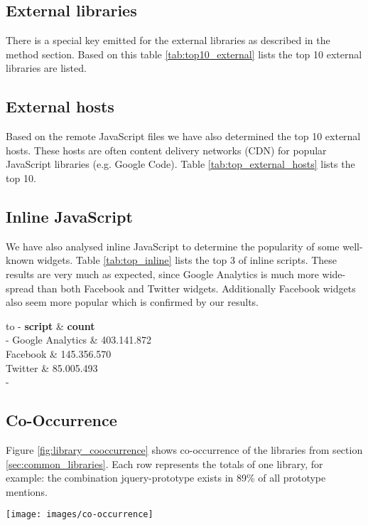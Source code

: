 

\subsection{External libraries}
There is a special key emitted for the external libraries as described in the method section. Based on this table \ref{tab:top10_external} lists the top 10 external libraries are listed.

\subsection{External hosts}
Based on the remote JavaScript files we have also determined the top 10 external hosts. These hosts are often content delivery networks (CDN) for popular JavaScript libraries (e.g. Google Code). Table \ref{tab:top_external_hosts} lists the top 10.



\subsection{Inline JavaScript}
We have also analysed inline JavaScript to determine the popularity of some well-known widgets. Table \ref{tab:top_inline} lists the top 3 of inline scripts. These results are very much as expected, since Google Analytics is much more wide-spread than both Facebook and Twitter widgets. Additionally Facebook widgets also seem more popular which is confirmed by our results.

\begin{table}
	\begin{tabu} to 
		\tabucline-
		\rowfont{\normalfont\bfseries}
		\textbf{script} & \textbf{count} \\
		\tabucline-
		Google Analytics				&	403.141.872	 \\
		Facebook 		&	145.356.570		 \\
		Twitter	&	85.005.493		 \\
		\tabucline-
	\end{tabu}
	\caption{Top 3 inline scripts\label{tab:top_inline}}
\end{table}


\subsection{Co-Occurrence}
Figure \ref{fig:library_cooccurrence} shows co-occurrence of the libraries from section \ref{sec:common_libraries}. Each row represents the totals of one library, for example: the combination jquery-prototype exists in 89\% of all prototype mentions.

\begin{figure*}[b]
	\centering
	\texttt{[image: images/co-occurrence]}
	\caption{Co-occurrence of JavaScript libraries}
	\label{fig:library_cooccurrence}
\end{figure*}


